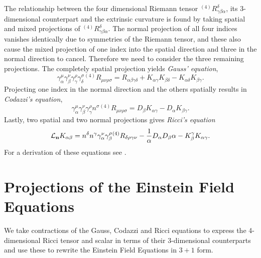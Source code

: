 The relationship between the four dimensional Riemann tensor $^{(4)}R^{\delta}_{\gamma \beta \alpha}$, its 3-dimensional counterpart and the extrinsic curvature is found by taking spatial and mixed projections of $^{(4)}R^{\delta}_{\gamma \beta \alpha}$. The normal projection of all four indices vanishes identically due to symmetries of the Riemann tensor, and these also cause the mixed projection of one index into the spatial direction and three in the normal direction to cancel. Therefore we need to consider the three remaining projections.
The completely spatial projection yields \textit{Gauss' equation},
\begin{equation}
\label{eq:Gauss}
\gamma_\alpha^\mu \gamma_\beta^\nu \gamma_\gamma^\rho \gamma_\delta^\sigma {}^{(4)}R_{\mu \nu \rho \sigma} = R_{\alpha \beta \gamma \delta} + K_{\alpha \gamma}K_{\beta \delta} - K_{\alpha \delta}K_{\beta \gamma}.
\end{equation}
Projecting one index in the normal direction and the others spatially results in \textit{Codazzi's equation},
\begin{equation}
\label{eq:Codazzi}
\gamma_\alpha^\mu \gamma_\beta^\nu \gamma_\gamma^\rho n^\sigma {}^{(4)}R_{\mu \nu \rho \sigma} = D_\beta K_{\alpha \gamma} - D_\alpha K_{\beta \gamma}.
\end{equation}
Lastly, two spatial and two normal projections gives \textit{Ricci's equation}
\begin{equation}
\label{eq:Ricci}
{\mathcal{L}}_{\mathbf{n}} K_{\alpha \beta} = n^\delta n^\gamma \gamma^\nu_\alpha \gamma^\rho_\beta {}^{(4)}R_{\delta \rho \gamma \nu}-\frac{1}{\alpha}D_\alpha D_\beta \alpha - K^{\gamma}_\beta K_{\alpha \gamma}.
\end{equation}
For a derivation of these equations see \cite{BaumgarteShapiro}.

\section{Projections of the Einstein Field Equations}
We take contractions of the Gauss, Codazzi and Ricci equations to express the 4-dimensional Ricci tensor and scalar in terms of their 3-dimensional counterparts and use these to rewrite the Einstein Field Equations in $3+1$ form. 

